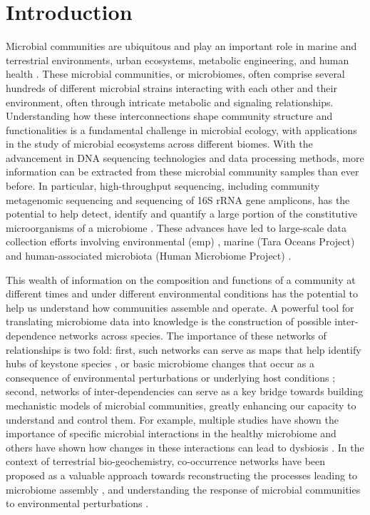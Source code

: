 
\section*{Introduction}

  Microbial communities are ubiquitous and play an important role in marine and terrestrial environments, urban ecosystems, metabolic engineering, and human health \cite{Ghoul2016,Thompson2017}.
  These microbial communities, or microbiomes, often comprise several hundreds of different microbial strains interacting with each other and their environment, often through intricate metabolic and signaling relationships.
  Understanding how these interconnections shape community structure and functionalities is a fundamental challenge in microbial ecology, with applications in the study of microbial ecosystems across different biomes. 
  With the advancement in DNA sequencing technologies \cite{Narihiro2017} and data processing methods,  more information can be extracted from these microbial community samples than ever before.
  In particular, high-throughput sequencing, including community metagenomic sequencing and sequencing of 16S rRNA gene amplicons, has the potential to help detect, identify and quantify a large portion of the constitutive microorganisms of a microbiome \cite{Jovel2016,Lloyd-Price2016}.
  These advances have led to large-scale data collection efforts involving environmental (\acl{emp}) \cite{Thompson2017}, marine (Tara Oceans Project) \cite{Zhang2015} and human-associated microbiota (Human Microbiome Project) \cite{HumanMicrobiomeProjectConsortium2012}.

 This wealth of information on the composition and functions of a community at different times and under different environmental conditions has the potential to help us understand how communities assemble and operate.
 A powerful tool for translating microbiome data into knowledge is the construction of possible inter-dependence networks across species.
 The importance of these networks of relationships is two fold: first, such networks can serve as maps that help identify hubs of keystone species \cite{Menon2018,Rottjers2018}, or basic microbiome changes that occur as a consequence of environmental perturbations or underlying host conditions \cite{Gilbert2016}; second, networks of inter-dependencies can serve as a key bridge towards building mechanistic models of microbial communities, greatly enhancing our capacity to understand and control them.
 For example, multiple studies have shown the importance of specific microbial interactions in the healthy microbiome \cite{Lloyd-Price2016} and others have shown how changes in these interactions can lead to dysbiosis \cite{Wang2017,Gilbert2016,Belizario2015}.
 In the context of terrestrial bio-geochemistry, co-occurrence networks have been proposed as a valuable approach towards reconstructing the processes leading to microbiome assembly \cite{Fierer2017}, and understanding the response of microbial communities to environmental perturbations \cite{Jiao2019}.

